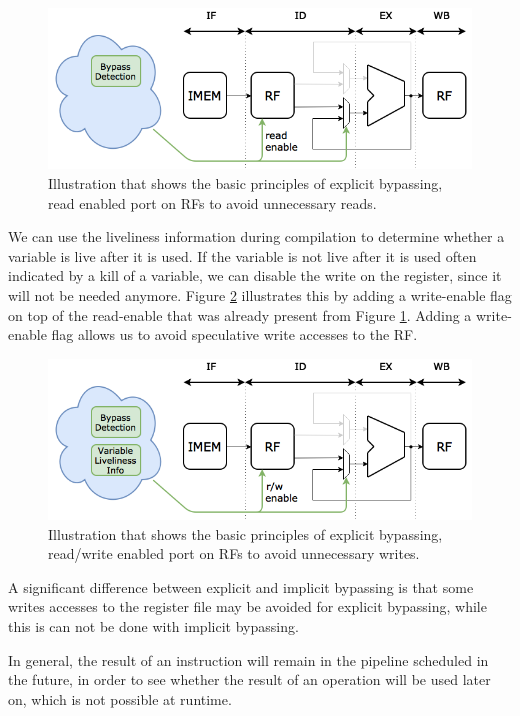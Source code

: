 \begin{figure}[H]
\centering
\includegraphics[width=.7\textwidth]{figures/expl_bypassing_principle/01_explicit_bypassing_principle}
\caption{Illustration that shows the basic principles of explicit bypassing, read enabled port on RFs to avoid unnecessary reads.}
\label{fig:exp_bypass_principle_r}
\end{figure}

We can use the liveliness information during compilation to determine whether a variable is live after it is used. If the variable is not live after it is used often indicated by a kill of a variable, we can disable the write on the register, since it will not be needed anymore. Figure \ref{fig:exp_bypass_principle_rw} illustrates this by adding a write-enable flag on top of the read-enable that was already present from Figure \ref{fig:exp_bypass_principle_r}. Adding a write-enable flag allows us to avoid speculative write accesses to the RF.

\begin{figure}[t]
\centering
\includegraphics[width=.7\textwidth]{figures/expl_bypassing_principle/02_explicit_bypassing_principle}
\caption{Illustration that shows the basic principles of explicit bypassing, read/write enabled port on RFs to avoid unnecessary writes.}
\label{fig:exp_bypass_principle_rw}
\end{figure}

A significant difference between explicit and implicit bypassing is that some writes accesses to the register file may be avoided for explicit bypassing, while this is can not be done with implicit bypassing.

In general, the result of an instruction will remain in the pipeline  scheduled in the future, in order to see whether the result of an operation will be used later on, which is not possible at runtime.

